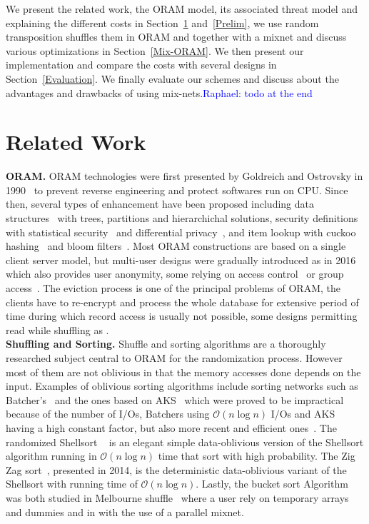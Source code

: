 \documentclass[USenglish,oneside,twocolumn]{article}
\newcommand{\raphael}[1]{\textcolor{blue}{Raphael: #1}}
\begin{document}
We present the related work, the ORAM model, its associated threat model and explaining the different costs in Section~\ref{Related} and~\ref{Prelim}, we use random transposition shuffles them in ORAM and together with a mixnet and discuss various optimizations in Section~\ref{Mix-ORAM}. We then present our implementation and compare the costs with several designs in Section~\ref{Evaluation}.
We finally evaluate our schemes and discuss about the advantages and drawbacks of using mix-nets.\raphael{todo at the end}
%

\section{Related Work}\label{Related}
\noindent\textbf{ORAM.}
ORAM technologies were first presented by Goldreich and Ostrovsky in 1990~\cite{ostrovsky1990efficient} to prevent reverse engineering and protect softwares run on CPU.
Since then, several types of enhancement have been proposed including data structures~\cite{goldreich1996software,stefanov2011towards,stefanov2013path,ren2014ring} with trees, partitions and hierarchichal solutions,
security definitions with statistical security~\cite{damgaard2011perfectly,ajtai2010oblivious} and differential privacy~\cite{wagh2016root}, and item lookup with cuckoo hashing~\cite{pinkas2010oblivious} and bloom filters~\cite{williams2008building}.
Most ORAM constructions are based on a single client server model, but multi-user designs were gradually introduced as \cite{backesanonymous} in 2016 which also provides user anonymity, some relying on access control~\cite{franz2011oblivious} or group access~\cite{goodrich2012privacy}.
The eviction process is one of the principal problems of ORAM, the clients have to re-encrypt and process the whole database for extensive period of time during which record access is usually not possible, some designs permitting read while shuffling as \cite{boneh2011}.\\

\noindent\textbf{Shuffling and Sorting.}
Shuffle and sorting algorithms are a thoroughly researched subject central to ORAM for the randomization process. However most of them are not oblivious in that the memory accesses done depends on the input.
Examples of oblivious sorting algorithms include sorting networks such as Batcher's~\cite{batcher1968sorting} and the ones based on AKS~\cite{ajtai19830} which were proved to be impractical because of the number of I/Os, Batchers using $\mathcal{O}\left ( n \log n \right)$ I/Os and AKS having a high constant factor, but also more recent and efficient ones~\cite{paterson1990improved}.
The randomized Shellsort ~\cite{goodrich2010randomized} is an elegant simple data-oblivious version of the Shellsort algorithm running in $\mathcal{O}\left ( n \log n \right)$ time that sort with high probability.
The Zig Zag sort~\cite{goodrich2014zig}, presented in 2014, is the deterministic data-oblivious variant of the Shellsort with running time of $\mathcal{O}\left ( n \log n\right)$.
Lastly, the bucket sort Algorithm was both studied in Melbourne shuffle~\cite{ohrimenko2014melbourne} where a user rely on temporary arrays and dummies and in \cite{goodrich2012anonymous} with the use of a parallel mixnet.\\
\end{document}

